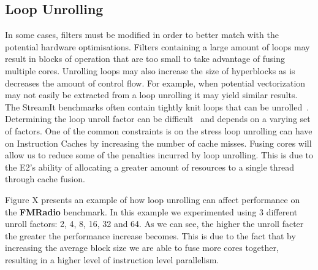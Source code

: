 \subsection{Loop Unrolling}
In some cases, filters must be modified in order to better match with the potential hardware optimisations.
Filters containing a large amount of loops may result in blocks of operation that are too small to take advantage of fusing multiple cores.
Unrolling loops may also increase the size of hyperblocks as is decreases the amount of control flow.
For example, when potential vectorization may not easily be extracted from a loop unrolling it may yield similar results.
The StreamIt benchmarks often contain tightly knit loops that can be unrolled~\cite{}.
Determining the loop unroll factor can be difficult~\cite{} and depends on a varying set of factors.
One of the common constraints is on the stress loop unrolling can have on Instruction Caches by increasing the number of cache misses.
Fusing cores will allow us to reduce some of the penalties incurred by loop unrolling.
This is due to the E2's ability of allocating a greater amount of resources to a single thread through cache fusion.

Figure X presents an example of how loop unrolling can affect performance on the \textbf{FMRadio} benchmark.
In this example we experimented using 3 different unroll factors: 2, 4, 8, 16, 32 and 64.
As we can see, the higher the unroll facter the greater the performance increase becomes.
This is due to the fact that by increasing the average block size we are able to fuse more cores together, resulting in a higher level of instruction level parallelism. 


